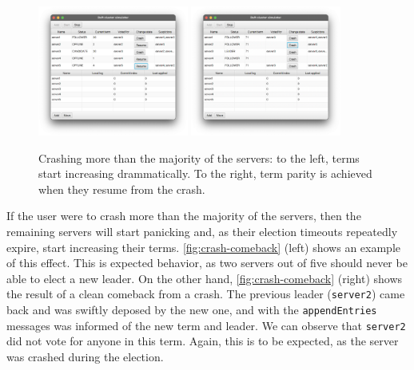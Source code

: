 \begin{figure}[ht]
    \centering
    \includegraphics[width=0.44\textwidth]{drawable/2a-chaos-leader.png}
    \includegraphics[width=0.44\textwidth]{drawable/3-leader-comeback.png}
    
    \caption{Crashing more than the majority of the servers: to the left, terms start increasing drammatically. To the right, term parity is achieved when they resume from the crash.}
    \label{fig:crash-comeback}
\end{figure}

If the user were to crash more than the majority of the servers, then the remaining servers will start panicking and, as their election timeouts repeatedly expire, start increasing their terms. \autoref{fig:crash-comeback} (left) shows an example of this effect. This is expected behavior, as two servers out of five should never be able to elect a new leader. On the other hand, \autoref{fig:crash-comeback} (right) shows the result of a clean comeback from a crash. The previous leader (\texttt{server2}) came back and was swiftly deposed by the new one, and with the \texttt{appendEntries} messages was informed of the new term and leader. We can observe that \texttt{server2} did not vote for anyone in this term. Again, this is to be expected, as the server was crashed during the election.


